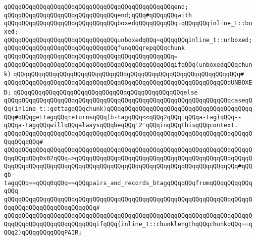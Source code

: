 \verb|qQQqqQQqqQQqqQQqqQQqqQQqqQQqqQQqqQQqqQQqqQQqqQQqend;|\newline
\newline
\verb|qQQqqQQqqQQqqQQqqQQqqQQqqQQqqQQqend;qQQq#qQQqqQQqwith|\newline
\newline
\verb|qQQqqQQqqQQqqQQqqQQqqQQqqQQqqQQqboxedqQQqqQQqqQQq=qQQqqQQqinline_t::boxed;|\newline
\verb|qQQqqQQqqQQqqQQqqQQqqQQqqQQqqQQqunboxedqQQq=qQQqqQQqinline_t::unboxed;|\newline
\newline
\verb|qQQqqQQqqQQqqQQqqQQqqQQqqQQqqQQqfunqQQqrepqQQqchunk|\newline
\verb|qQQqqQQqqQQqqQQqqQQqqQQqqQQqqQQqqQQqqQQqqQQqqQQq=|\newline
\verb|qQQqqQQqqQQqqQQqqQQqqQQqqQQqqQQqqQQqqQQqqQQqqQQqifqQQq(unboxedqQQqchunk)|\newline
\verb|qQQqqQQqqQQqqQQqqQQqqQQqqQQqqQQqqQQqqQQqqQQqqQQqqQQqqQQqqQQqqQQq#|\newline
\verb|qQQqqQQqqQQqqQQqqQQqqQQqqQQqqQQqqQQqqQQqqQQqqQQqqQQqqQQqqQQqqQQqUNBOXED;|\newline
\verb|qQQqqQQqqQQqqQQqqQQqqQQqqQQqqQQqqQQqqQQqqQQqqQQqelse|\newline
\verb|qQQqqQQqqQQqqQQqqQQqqQQqqQQqqQQqqQQqqQQqqQQqqQQqqQQqqQQqqQQqqQQqcaseqQQq(inline_t::gettagqQQqchunk)qQQqqQQqqQQqqQQqqQQqqQQqqQQqqQQqqQQqqQQqqQQq#qQQqgettagqQQqreturnsqQQq(b-tagqQQq<<qQQq2qQQq|\verb#|qQQqa-tag)qQQq--qQQqa-tagqQQqwillqQQqalwaysqQQqbeqQQq'2'qQQqinqQQqthisqQQqcontext.#\newline
\verb|qQQqqQQqqQQqqQQqqQQqqQQqqQQqqQQqqQQqqQQqqQQqqQQqqQQqqQQqqQQqqQQqqQQqqQQqqQQqqQQq#|\newline
\verb|qQQqqQQqqQQqqQQqqQQqqQQqqQQqqQQqqQQqqQQqqQQqqQQqqQQqqQQqqQQqqQQqqQQqqQQqqQQqqQQq0x02qQQq=>qQQqqQQqqQQqqQQqqQQqqQQqqQQqqQQqqQQqqQQqqQQqqQQqqQQqqQQqqQQqqQQqqQQqqQQqqQQqqQQqqQQqqQQqqQQqqQQqqQQqqQQqqQQqqQQqqQQq#qQQqb-tagqQQq==qQQq0qQQq==qQQqpairs_and_records_btagqQQqqQQqfromqQQqqQQqqQQqqQQq|\newline
\verb|qQQqqQQqqQQqqQQqqQQqqQQqqQQqqQQqqQQqqQQqqQQqqQQqqQQqqQQqqQQqqQQqqQQqqQQqqQQqqQQqqQQqqQQqqQQqqQQq#|\newline
\verb|qQQqqQQqqQQqqQQqqQQqqQQqqQQqqQQqqQQqqQQqqQQqqQQqqQQqqQQqqQQqqQQqqQQqqQQqqQQqqQQqqQQqqQQqqQQqqQQqifqQQq(inline_t::chunklengthqQQqchunkqQQq==qQQq2)qQQqqQQqqQQqPAIR;|\newline
